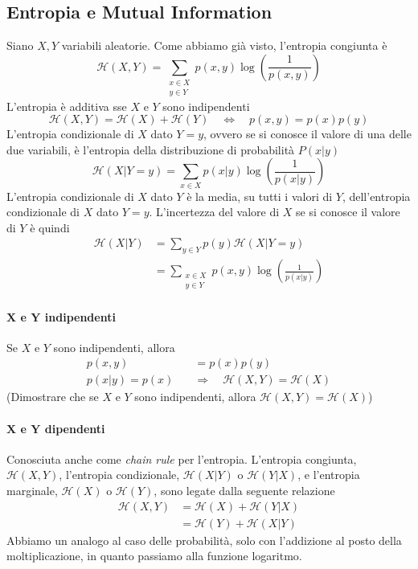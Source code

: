 \subsection{Entropia e Mutual Information}
Siano $X,Y$ variabili aleatorie. Come abbiamo già visto, l'entropia congiunta è 
$$
    \mathcal{H}(X,Y) = \sum_{\substack{x\in X\\y\in Y}} p(x,y)\log \left(\frac{1}{p(x,y)}\right)
$$
L'entropia è additiva sse $X$ e $Y$ sono indipendenti
$$
    \mathcal{H}(X,Y) = \mathcal{H}(X) + \mathcal{H}(Y)
    \quad \Leftrightarrow \quad
    p(x,y) = p(x)p(y)
$$
L'entropia condizionale di $X$ dato $Y=y$, ovvero se si conosce il valore di una delle due variabili, è l'entropia della distribuzione di probabilità $P(x|y)$
$$
    \mathcal{H}(X|Y=y) = \sum_{x\in X} p(x|y)\log \left(\frac{1}{p(x|y)}\right)
$$
L'entropia condizionale di $X$ dato $Y$ è la media, su tutti i valori di $Y$, dell'entropia condizionale di $X$ dato $Y=y$.
L'incertezza del valore di $X$ se si conosce il valore di $Y$ è quindi
\begin{align*}
    \mathcal{H}(X|Y) &= \sum_{y\in Y} p(y)\mathcal{H}(X|Y=y)\\
    &= \sum_{\substack{x\in X\\y\in Y}} p(x,y)\log \left(\frac{1}{p(x|y)}\right)
\end{align*}


\paragraph{$\bm{X}$ e $\bm{Y}$ indipendenti} Se $X$ e $Y$ sono indipendenti, allora
\begin{align*}
    p(x,y) &= p(x)p(y)\\
    p(x|y) = p(x) \quad &\Rightarrow \quad \mathcal{H}(X,Y) = \mathcal{H}(X)
\end{align*}
(Dimostrare che se $X$ e $Y$ sono indipendenti, allora $\mathcal{H}(X,Y) = \mathcal{H}(X)$)

\paragraph{$\bm{X}$ e $\bm{Y}$ dipendenti} Conosciuta anche come \emph{chain rule} per l'entropia. L'entropia congiunta, $\mathcal{H}(X,Y)$, l'entropia condizionale, $\mathcal{H}(X|Y)$ o $\mathcal{H}(Y|X)$, e l'entropia marginale, $\mathcal{H}(X)$ o $\mathcal{H}(Y)$, sono legate dalla seguente relazione
\begin{align*}
    \mathcal{H}(X,Y) &= \mathcal{H}(X) + \mathcal{H}(Y|X)\\
    &= \mathcal{H}(Y) + \mathcal{H}(X|Y)
\end{align*}
Abbiamo un analogo al caso delle probabilità, solo con l'addizione al posto della moltiplicazione, in quanto passiamo alla funzione logaritmo.


